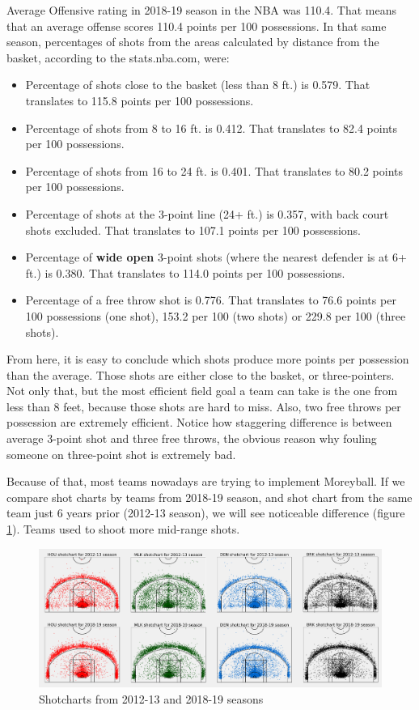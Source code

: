 \documentclass[a4paper]{article}
\begin{document}
Average Offensive rating in 2018-19 season in the NBA was 110.4. That means that an average offense scores 110.4 points per 100 possessions. In that same season, percentages of shots from the areas calculated by distance from the basket, according to the stats.nba.com, were:

\begin{itemize}
	\item Percentage of shots close to the basket (less than 8 ft.) is 0.579. That translates to 115.8 points per 100 possessions.
	\item Percentage of shots from 8 to 16 ft. is 0.412. That translates to 82.4 points per 100 possessions.
	\item Percentage of shots from 16 to 24 ft. is 0.401. That translates to 80.2 points per 100 possessions.
	\item Percentage of shots at the 3-point line (24+ ft.) is 0.357, with back court shots excluded. That translates to 107.1 points per 100 possessions.
	\item Percentage of \textbf{wide open} 3-point shots (where the nearest defender is at 6+ ft.) is 0.380. That translates to 114.0 points per 100 possessions.
	\item Percentage of a free throw shot is 0.776. That translates to 76.6 points per 100 possessions (one shot), 153.2 per 100 (two shots) or 229.8 per 100 (three shots).
\end{itemize}

From here, it is easy to conclude which shots produce more points per possession than the average. Those shots are either close to the basket, or three-pointers. Not only that, but the most efficient field goal a team can take is the one from less than 8 feet, because those shots are hard to miss. Also, two free throws per possession are extremely efficient. Notice how staggering difference is between average 3-point shot and three free throws, the obvious reason why fouling someone on three-point shot is extremely bad.

Because of that, most teams nowadays are trying to implement Moreyball. If we compare shot charts by teams from 2018-19 season, and shot chart from the same team just 6 years prior (2012-13 season), we will see noticeable difference (figure \ref{plt:shotcharts}). Teams used to shoot more mid-range shots.

\begin{figure}[h!]
\begin{center}
\includegraphics[scale=0.27]{shotcharts.png}
\end{center}
\caption{Shotcharts from 2012-13 and 2018-19 seasons}
\label{plt:shotcharts}
\end{figure}
\end{document}
